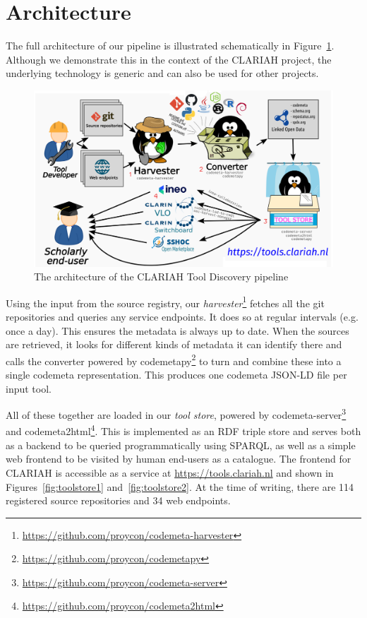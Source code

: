 \documentclass[a4paper,11pt]{article}
\begin{document}
\section{Architecture}

The full architecture of our pipeline is illustrated schematically in
Figure~\ref{fig:architecture}. Although we demonstrate this in the context of the
CLARIAH project, the underlying technology is generic and can also be used for
other projects.

\begin{figure}[h]
\begin{center}
\includegraphics[width=14.0cm]{architecture.png}
\caption{The architecture of the CLARIAH Tool Discovery pipeline}
\label{fig:architecture}
\end{center}
\end{figure}

Using the input from the source registry, our
\emph{harvester}\footnote{\url{https://github.com/proycon/codemeta-harvester}} \citep{CODEMETAHARVESTER} fetches all the git
repositories and queries any service endpoints. It does so at regular intervals
(e.g. once a day). This ensures the metadata is always up to date. When the
sources are retrieved, it looks for different kinds of metadata it can identify
there and calls the converter powered by codemetapy\footnote{\url{https://github.com/proycon/codemetapy}} \citep{CODEMETAPY}
to turn and combine these into a single codemeta representation. This produces
one codemeta JSON-LD file per input tool. 

All of these together are loaded in our \emph{tool store}, powered by codemeta-server\footnote{\url{https://github.com/proycon/codemeta-server}} \citep{CODEMETASERVER} and codemeta2html\footnote{\url{https://github.com/proycon/codemeta2html}}. This is
implemented as an RDF triple store and serves both as a backend to be queried
programmatically using SPARQL, as well as a simple web frontend to be visited
by human end-users as a catalogue. The frontend for CLARIAH is
accessible as a service at \url{https://tools.clariah.nl} and shown in 
Figures~\ref{fig:toolstore1} and~\ref{fig:toolstore2}.
At the time of writing, there are 114 registered source repositories and 34 web endpoints.
\end{document}
